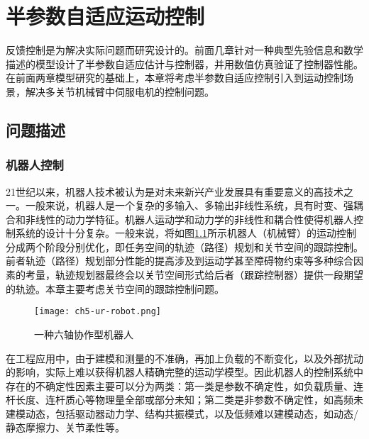 \chapter{半参数自适应运动控制}\label{chap:5}
反馈控制是为解决实际问题而研究设计的。前面几章针对一种典型先验信息和数学描述的模型设计了半参数自适应估计与控制器，并用数值仿真验证了控制器性能。在前面两章模型研究的基础上，本章将考虑半参数自适应控制引入到运动控制场景，解决多关节机械臂中伺服电机的控制问题。
\section{问题描述}\label{chap:5.1}
\subsection{机器人控制}\label{5.1.1}
21世纪以来，机器人技术被认为是对未来新兴产业发展具有重要意义的高技术之一。一般来说，机器人是一个复杂的多输入、多输出非线性系统，具有时变、强耦合和非线性的动力学特征。机器人运动学和动力学的非线性和耦合性使得机器人控制系统的设计十分复杂。一般来说，将如图\ref{fig.robot}所示机器人（机械臂）的运动控制分成两个阶段分别优化，即任务空间的轨迹（路径）规划和关节空间的跟踪控制。前者轨迹（路径）规划部分性能的提高涉及到运动学甚至障碍物约束等多种综合因素的考量，轨迹规划器最终会以关节空间形式给后者（跟踪控制器）提供一段期望的轨迹。本章主要考虑关节空间的跟踪控制问题。

\begin{figure}[!htb]
	\centering
	\texttt{[image: ch5-ur-robot.png]}\\	 %
	\caption{一种六轴协作型机器人}
	\label{fig.robot}
\end{figure}

在工程应用中，由于建模和测量的不准确，再加上负载的不断变化，以及外部扰动的影响，实际上难以获得机器人精确完整的运动学模型。因此机器人的控制系统中存在的不确定性因素主要可以分为两类：第一类是参数不确定性，如负载质量、连杆长度、连杆质心等物理量全部或部分未知；第二类是非参数不确定性，如高频未建模动态，包括驱动器动力学、结构共振模式，以及低频难以建模动态，如动态/静态摩擦力、关节柔性等。

